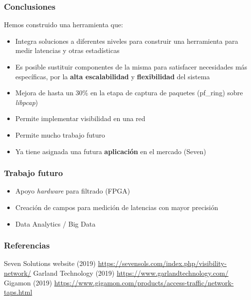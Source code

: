 \documentclass{beamer}
\begin{document}

\begin{frame}
\frametitle{Conclusiones}
Hemos construido una herramienta que:

\begin{itemize}
	\item Integra soluciones a diferentes niveles para construir una herramienta para medir latencias y otras estadísticas
	\item Es posible sustituir componentes de la misma para satisfacer necesidades más específicas, por la \textbf{alta escalabilidad} y \textbf{flexibilidad} del sistema
	\item Mejora de hasta un 30\% en la etapa de captura de paquetes (pf\_ring) sobre \textit{libpcap})
	\item Permite implementar visibilidad en una red
	\item Permite mucho trabajo futuro
	\item Ya tiene asignada una futura \textbf{aplicación} en el mercado (Seven)
\end{itemize}

\end{frame}


\begin{frame}
\frametitle{Trabajo futuro}
\begin{itemize}
	\item Apoyo \textit{hardware} para filtrado (FPGA)
	\item Creación de campos para medición de latencias con mayor precisión
	\item Data Analytics / Big Data
\end{itemize}

\end{frame}


\begin{frame}
\frametitle{Referencias}
\footnotesize{
\begin{thebibliography}{99} %
 Seven Solutions website (2019)
\newblock \url{https://sevensols.com/index.php/visibility-network/}
 Garland Technology (2019)
\newblock \url{https://www.garlandtechnology.com/}
 Gigamon (2019)
\newblock \url{https://www.gigamon.com/products/access-traffic/network-taps.html}
\end{thebibliography}
}
\end{frame}

\end{document}
